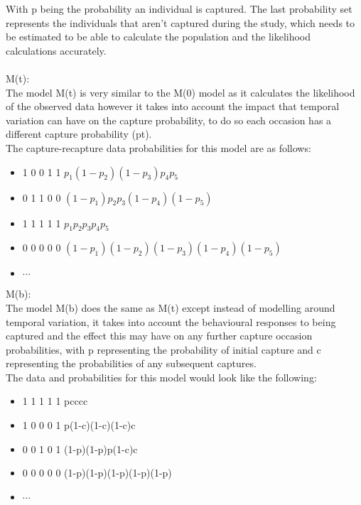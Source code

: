 \documentclass[,oneside]{article}
\numberwithin{equation}{section}
\begin{document}
With p being the probability an individual is captured. The last probability set represents the individuals that aren’t captured during the study, which needs to be estimated to be able to calculate the population and the likelihood calculations accurately. \\ \\
M(t):\\
The model M(t) is very similar to the M(0) model as it calculates the likelihood of the observed data however it takes into account the impact that temporal variation can have on the capture probability, to do so each occasion has a different capture probability (pt).\\
The capture-recapture data probabilities for this model are as follows:
\begin{itemize}
\item 1 0 0 1 1 \hspace{1cm}$p_1(1-p_2)(1-p_3)p_4p_5$
\item 0 1 1 0 0 \hspace{1cm}$(1-p_1)p_2p_3(1-p_4)(1-p_5)$
\item 1 1 1 1 1 \hspace{1cm}$p_1p_2p_3p_4p_5$
\item 0 0 0 0 0 \hspace{1cm}$(1-p_1)(1-p_2)(1-p_3)(1-p_4)(1-p_5)$
\item $\cdots$
\end{itemize}

M(b): \\
The model M(b) does the same as M(t) except instead of modelling around temporal variation, it takes into account the behavioural responses to being captured and the effect this may have on any further capture occasion probabilities, with p representing the probability of initial capture and c representing the probabilities of any subsequent captures.\\
The data and probabilities for this model would look like the following: 
\begin{itemize}
\item 1 1 1 1 1 \hspace{1cm}pcccc
\item 1 0 0 0 1 \hspace{1cm}p(1-c)(1-c)(1-c)c
\item 0 0 1 0 1 \hspace{1cm}(1-p)(1-p)p(1-c)c
\item 0 0 0 0 0 \hspace{1cm}(1-p)(1-p)(1-p)(1-p)(1-p)
\item $\cdots$
\end{itemize}
\end{document}
